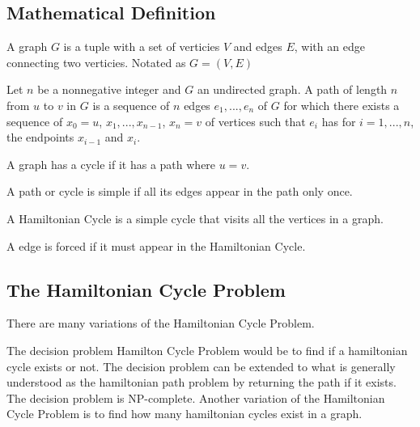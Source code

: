 \subsection{Mathematical Definition}

\begin{definition}[Graph]
    A graph $G$ is a tuple with a set of verticies $V$ and edges $E$, with an
    edge connecting two verticies. Notated as $G = (V, E)$
\end{definition}

\begin{definition}
    Let $n$ be a nonnegative integer and $G$ an undirected graph. A path of
    length $n$ from $u$ to $v$ in $G$ is a sequence of $n$ edges $e_1,...,e_n$
    of $G$ for which there exists a sequence of $x_0 = u$, $x_1, ..., x_{n-1}$,
    $x_n = v$ of vertices such that $e_i$ has for $i = 1, ..., n$, the endpoints
    $x_{i-1}$ and $x_i$.
\end{definition}

\begin{definition}
    A graph has a cycle if it has a path where $u = v$.
\end{definition}

\begin{definition}
    A path or cycle is simple if all its edges appear in the path only once.
\end{definition}


\begin{definition}
    A Hamiltonian Cycle is a simple cycle that visits all the vertices in a
    graph.
\end{definition}

\begin{definition}
    A edge is forced if it must appear in the Hamiltonian Cycle.
\end{definition}

\subsection{The Hamiltonian Cycle Problem}

There are many variations of the Hamiltonian Cycle Problem.

The decision problem Hamilton Cycle Problem would be to find if a hamiltonian
cycle exists or not. The decision problem can be extended to what is generally
understood as the hamiltonian path problem by returning the path if it exists.
The decision problem is NP-complete. Another variation of the Hamiltonian Cycle
Problem is to find how many hamiltonian cycles exist in a graph.

